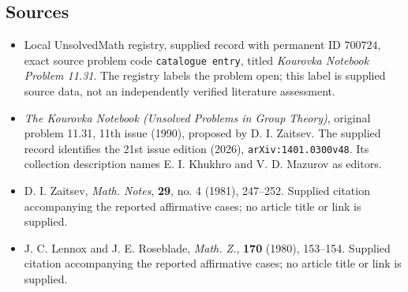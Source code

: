 \documentclass[11pt]{article}
\begin{document}
\subsection{Sources}
\begin{itemize}
\item Local UnsolvedMath registry, supplied record with permanent ID \(700724\), exact source problem code \texttt{catalogue entry}, titled \emph{Kourovka Notebook Problem 11.31}. The registry labels the problem open; this label is supplied source data, not an independently verified literature assessment.
\item \emph{The Kourovka Notebook (Unsolved Problems in Group Theory)}, original problem 11.31, 11th issue (1990), proposed by D. I. Zaitsev. The supplied record identifies the 21st issue edition (2026), \texttt{arXiv:1401.0300v48}. Its collection description names E. I. Khukhro and V. D. Mazurov as editors.
\item D. I. Zaitsev, \emph{Math. Notes}, \textbf{29}, no. 4 (1981), 247--252. Supplied citation accompanying the reported affirmative cases; no article title or link is supplied.
\item J. C. Lennox and J. E. Roseblade, \emph{Math. Z.}, \textbf{170} (1980), 153--154. Supplied citation accompanying the reported affirmative cases; no article title or link is supplied.
\end{itemize}
\end{document}
